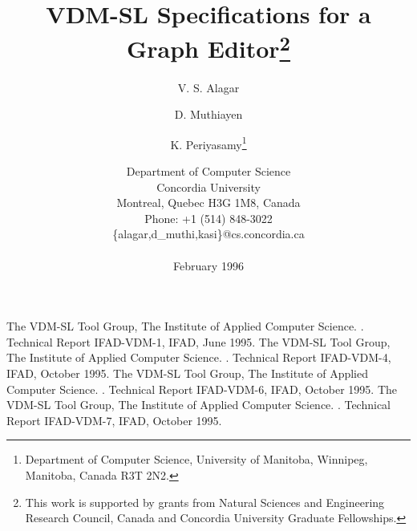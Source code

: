 \documentclass{article}
\title{\Large\bf VDM-SL Specifications for a Graph Editor\footnote
	{This work is supported by grants from Natural Sciences and
	Engineering Research Council, Canada and Concordia University Graduate
	Fellowships.}}
\author{V. S. Alagar \and D. Muthiayen \and K. Periyasamy\thanks{Department
		of Computer Science, University of Manitoba, Winnipeg,
		Manitoba, Canada R3T 2N2.}}
\date{Department of Computer Science\\ Concordia University\\
	Montreal, Quebec H3G 1M8, Canada\\
	Phone: +1 (514) 848-3022\\
	\{alagar,d\_muthi,kasi\}@cs.concordia.ca\\~\\
	February 1996}
\begin{document}
\maketitle
\thispagestyle{empty}



\newpage
\begin{thebibliography}{99}
\small
\baselineskip=12pt
The VDM-SL Tool Group, The Institute of Applied Computer Science.
.
\newblock Technical Report IFAD-VDM-1, IFAD, June 1995.
The VDM-SL Tool Group, The Institute of Applied Computer Science.
.
\newblock Technical Report IFAD-VDM-4, IFAD, October 1995.
The VDM-SL Tool Group, The Institute of Applied Computer Science.
.
\newblock Technical Report IFAD-VDM-6, IFAD, October 1995.
The VDM-SL Tool Group, The Institute of Applied Computer Science.
.
\newblock Technical Report IFAD-VDM-7, IFAD, October 1995.
\end{thebibliography}
\end{document}
